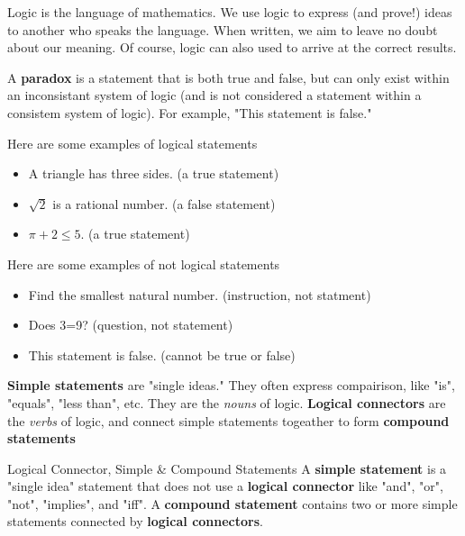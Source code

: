 Logic is the language of mathematics. We use logic to express (and prove!) ideas to another who speaks the language. When written, we aim to leave no doubt about our meaning. Of course, logic can also used to arrive at the correct results.

\begin{boxremark*}{}{}
	A {\bf paradox} is a statement that is both true and false, but can only exist within an inconsistant system of logic (and is not considered a statement within a consistem system of logic). For example, "This statement is false."
\end{boxremark*}

\begin{boxexample}{}{}
	Here are some examples of logical statements
	\begin{itemize}
		\item A triangle has three sides. (a true statement)
		\item $\sqrt 2$ is a rational number. (a false statement)
		\item $\pi + 2 \leq 5$. (a true statement)
	\end{itemize}
\end{boxexample}

\begin{boxexample}{}{}
	Here are some examples of not logical statements
	\begin{itemize}
		\item Find the smallest natural number. (instruction, not statment)
		\item Does 3=9? (question, not statement)
		\item This statement is false. (cannot be true or false)
	\end{itemize}
\end{boxexample}

{\bf Simple statements} are "single ideas." They often express compairison, like "is", "equals", "less than", etc. They are the \emph{nouns} of logic. {\bf Logical connectors} are the \emph{verbs} of logic, and connect simple statements togeather to form {\bf compound statements}

\begin{boxdefine}{Logical Connector, Simple \& Compound Statements}{}
	A {\bf simple statement} is a "single idea" statement that does not use a {\bf logical connector} like "and", "or", "not", "implies", and "iff".
	A {\bf compound statement} contains two or more simple statements connected by {\bf logical connectors}.
\end{boxdefine}

